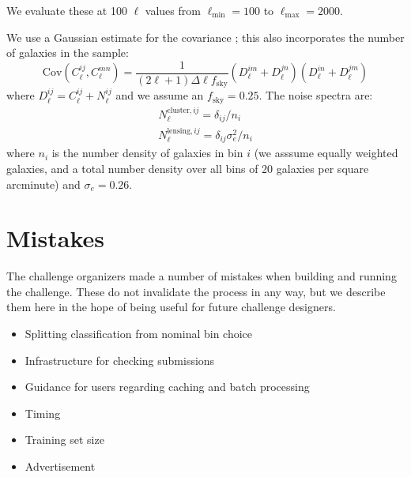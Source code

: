 \documentclass[twocolumn,twocolappendix]{aastex63}
\begin{document}
We evaluate these at 100 $\ell$ values from $\ell_\mathrm{min}=100$ to $\ell_\mathrm{max}=2000$.

We use a Gaussian estimate for the covariance \citep{takada_jain}; this also incorporates the number of galaxies in the
sample:
\begin{equation}
    \mathrm{Cov}(C^{ij}_\ell, C^{mn}_\ell) = \frac{1}{(2 \ell + 1)\Delta\ell f_\mathrm{sky}}(D^{im}_\ell + D^{jn}_\ell)(D^{in}_\ell + D^{jm}_\ell)
\end{equation}
where $D^{ij}_\ell = C^{ij}_\ell + N^{ij}_\ell$ and we assume an $f_\mathrm{sky}=0.25$.  The noise spectra are:
\begin{align}
N^{\mathrm{cluster},ij}_\ell = \delta_{ij} / n_i \\
N^{\mathrm{lensing},ij}_\ell = \delta_{ij} \sigma_e^2 / n_i
\end{align}
where $n_i$ is the number density of galaxies in bin $i$ (we asssume equally weighted galaxies, and a 
total number density over all bins of 20 galaxies per square arcminute) and $\sigma_e=0.26$.

\section{Mistakes}
The challenge organizers made a number of mistakes when building and running the challenge.
These do not invalidate the process in any way, but we describe them here in the hope of
being useful for future challenge designers.

\begin{itemize}
    \item Splitting classification from nominal bin choice
    \item Infrastructure for checking submissions
    \item Guidance for users regarding caching and batch processing
    \item Timing
    \item Training set size
    \item Advertisement
\end{itemize}

\end{document}

